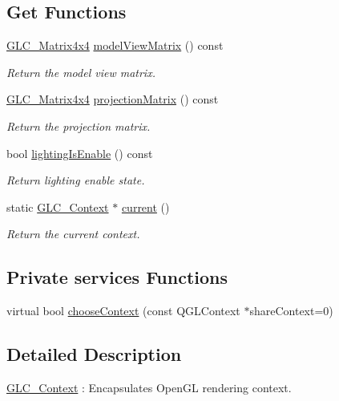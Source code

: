 \subsection*{Get Functions}
\begin{DoxyCompactItemize}
\item 
\hyperlink{class_g_l_c___matrix4x4}{G\-L\-C\-\_\-\-Matrix4x4} \hyperlink{class_g_l_c___context_a92b5c3a79026269b4de4c64957c488bc}{model\-View\-Matrix} () const 
\begin{DoxyCompactList}\small\item\em Return the model view matrix. \end{DoxyCompactList}\item 
\hyperlink{class_g_l_c___matrix4x4}{G\-L\-C\-\_\-\-Matrix4x4} \hyperlink{class_g_l_c___context_a4180b8cd13ea8d4040fb55317a855dd3}{projection\-Matrix} () const 
\begin{DoxyCompactList}\small\item\em Return the projection matrix. \end{DoxyCompactList}\item 
bool \hyperlink{class_g_l_c___context_a5beaeaccd87dcbf1d9f3d1299fda82ce}{lighting\-Is\-Enable} () const 
\begin{DoxyCompactList}\small\item\em Return lighting enable state. \end{DoxyCompactList}\item 
static \hyperlink{class_g_l_c___context}{G\-L\-C\-\_\-\-Context} $\ast$ \hyperlink{class_g_l_c___context_a4534815e72d7afc95e829ec8616539fb}{current} ()
\begin{DoxyCompactList}\small\item\em Return the current context. \end{DoxyCompactList}\end{DoxyCompactItemize}
\subsection*{Private services Functions}
\begin{DoxyCompactItemize}
\item 
virtual bool \hyperlink{class_g_l_c___context_afde38d2c69cb7f0f92ed1fa7c697e19d}{choose\-Context} (const Q\-G\-L\-Context $\ast$share\-Context=0)
\end{DoxyCompactItemize}


\subsection{Detailed Description}
\hyperlink{class_g_l_c___context}{G\-L\-C\-\_\-\-Context} \-: Encapsulates Open\-G\-L rendering context. 

